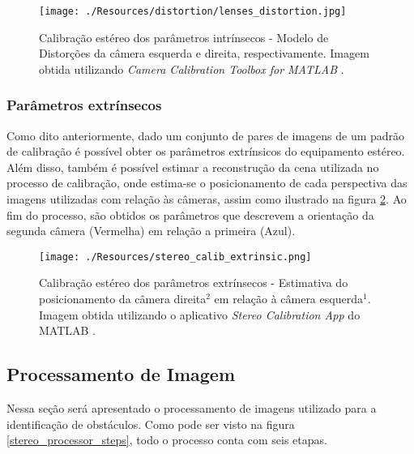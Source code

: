 \begin{figure}[p]
 	\centering
 	\texttt{[image: ./Resources/distortion/lenses\_distortion.jpg]}
 	\caption{Calibração estéreo dos parâmetros intrínsecos - Modelo de Distorções da câmera esquerda e direita, respectivamente. Imagem obtida utilizando \textit{Camera Calibration Toolbox for MATLAB} \cite{Bouguet1999}.}
 	\label{lenses_distortion}
\end{figure}


\subsubsection{Parâmetros extrínsecos}

Como dito anteriormente, dado um conjunto de pares de imagens de um padrão de calibração é possível obter os parâmetros extrínsicos do equipamento estéreo. Além disso, também é possível estimar a reconstrução da cena utilizada no processo de calibração, onde estima-se o posicionamento de cada perspectiva das imagens utilizadas com relação às câmeras, assim como ilustrado na figura \ref{stereo_calib_extrinsic}. Ao fim do processo, são obtidos os parâmetros que descrevem a orientação da segunda câmera (Vermelha) em relação a primeira (Azul).

\begin{figure}[h]
 	\centering
 	\texttt{[image: ./Resources/stereo\_calib\_extrinsic.png]}
 	\caption{Calibração estéreo dos parâmetros extrínsecos - Estimativa do posicionamento da câmera direita$^2$ em relação à câmera esquerda$^1$. Imagem obtida utilizando o aplicativo \textit{Stereo Calibration App} do MATLAB \cite{MatlabStereoApp}.}
 	\label{stereo_calib_extrinsic}
\end{figure}

\subsection{Processamento de Imagem}

Nessa seção será apresentado o processamento de imagens utilizado para a identificação de obstáculos. Como pode ser visto na figura \ref{stereo_processor_steps}, todo o processo conta com seis etapas.

